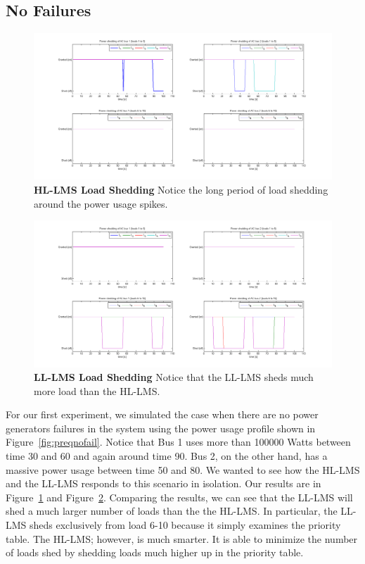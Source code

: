 \documentclass{acm_proc_article-sp}
\begin{document}
\subsection{No Failures}
\begin{figure}[ht]
  \centering
  \includegraphics[width=0.9\columnwidth]{figures/lshlnofail.png}
  \caption{\textbf{HL-LMS Load Shedding} Notice the long
  period of load shedding around the power usage spikes.}
  \label{fig:lshlnofail}
\end{figure}
\begin{figure}[ht]
  \centering
  \includegraphics[width=0.9\columnwidth]{figures/lsllnofail.png}
  \caption{\textbf{LL-LMS Load Shedding} Notice that the 
  LL-LMS sheds much more load than the HL-LMS.}
  \label{fig:lsllnofail}
\end{figure}

For our first experiment, we simulated the case when there are no power
generators failures in the system using the power usage profile shown in
Figure~\ref{fig:preqnofail}. Notice that Bus 1 uses more than 100000 Watts
between time 30 and 60 and again around time 90. Bus 2, on the other hand,
has a massive power usage between time 50 and 80. We wanted to see how the
HL-LMS and the LL-LMS responds to this scenario in isolation. Our results
are in Figure~\ref{fig:lshlnofail} and Figure~\ref{fig:lsllnofail}.
Comparing the results, we can see that the LL-LMS will shed a much larger
number of loads than the the HL-LMS. In particular, the LL-LMS sheds
exclusively from load 6-10 because it simply examines the priority table.
The HL-LMS; however, is much smarter. It is able to minimize the number of
loads shed by shedding loads much higher up in the priority table.
\end{document}
